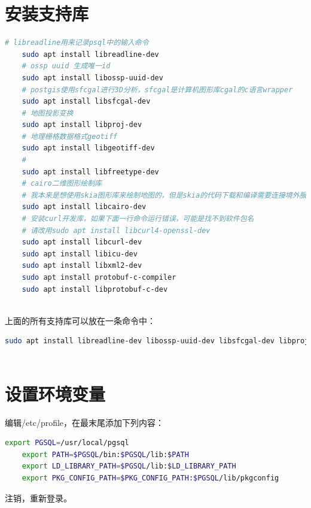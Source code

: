\section{安装支持库}
\begin{lstlisting}[backgroundcolor = \color{codebackground}, language=bash]
	# libreadline用来记录psql中的输入命令
	sudo apt install libreadline-dev 
	# ossp uuid 生成唯一id
	sudo apt install libossp-uuid-dev
	# postgis使用sfcgal进行3D分析，sfcgal是计算机图形库cgal的c语言wrapper
	sudo apt install libsfcgal-dev
	# 地图投影变换
	sudo apt install libproj-dev
	# 地理栅格数据格式geotiff
	sudo apt install libgeotiff-dev
	# 
	sudo apt install libfreetype-dev
	# cairo二维图形绘制库
	# 我本来是想使用skia图形库来绘制地图的，但是skia的代码下载和编译需要连接境外服务器，而现在的网络环境一言难尽...。所以就只能换成cairo图形库来进行地图的绘制咯。
	sudo apt install libcairo-dev
	# 安装curl开发库，如果下面一行命令运行错误，可能是找不到软件包名
	# 请改用sudo apt install libcurl4-openssl-dev
	sudo apt install libcurl-dev
	sudo apt install libicu-dev
	sudo apt install libxml2-dev
	sudo apt install protobuf-c-compiler
	sudo apt install libprotobuf-c-dev
	
\end{lstlisting}

上面的所有支持库可以放在一条命令中：
\begin{lstlisting}[backgroundcolor = \color{codebackground}, language=bash]
	sudo apt install libreadline-dev libossp-uuid-dev libsfcgal-dev libproj-dev libgeotiff-dev libcairo-dev libcurl-dev libicu-dev libxml2-dev protobuf-c-compiler libprotobuf-c-dev
	
\end{lstlisting}

\section{设置环境变量}
编辑/etc/profile，在最末尾添加下列内容：
\begin{lstlisting}[backgroundcolor = \color{codebackground}, language=bash]
	export PGSQL=/usr/local/pgsql
	export PATH=$PGSQL/bin:$PGSQL/lib:$PATH
	export LD_LIBRARY_PATH=$PGSQL/lib:$LD_LIBRARY_PATH
	export PKG_CONFIG_PATH=$PKG_CONFIG_PATH:$PGSQL/lib/pkgconfig
\end{lstlisting}
注销，重新登录。

